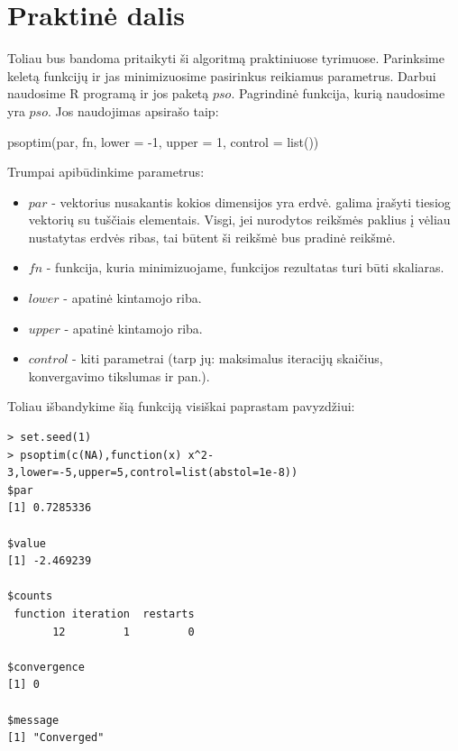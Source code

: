 \documentclass[12pt,a4paper]{article}
\begin{document}
\section{Praktinė dalis}

Toliau bus bandoma pritaikyti ši algoritmą praktiniuose tyrimuose. Parinksime keletą funkcijų ir jas minimizuosime pasirinkus reikiamus parametrus. Darbui naudosime R programą ir jos paketą $pso$. 
Pagrindinė funkcija, kurią naudosime yra $pso$. Jos naudojimas apsirašo taip:


\begin{verbatim*}
psoptim(par, fn, lower = -1, upper = 1, control = list())
\end{verbatim*}

Trumpai apibūdinkime parametrus:

\begin{itemize}
\item $par$ - vektorius nusakantis kokios dimensijos yra erdvė. galima įrašyti tiesiog vektorių su tuščiais elementais. Visgi, jei nurodytos reikšmės paklius į vėliau nustatytas erdvės ribas, tai būtent ši reikšmė bus pradinė reikšmė.
\item $fn$ - funkcija, kuria minimizuojame, funkcijos rezultatas turi būti skaliaras.
\item $lower$  - apatinė kintamojo riba.
\item $upper$  - apatinė kintamojo riba.
\item $control$  - kiti parametrai (tarp jų: maksimalus iteracijų skaičius, konvergavimo tikslumas ir pan.).

\end{itemize}

Toliau išbandykime šią funkciją visiškai paprastam pavyzdžiui:

\begin{spacing}{1}
\begin{verbatim}
> set.seed(1)
> psoptim(c(NA),function(x) x^2-3,lower=-5,upper=5,control=list(abstol=1e-8))
$par
[1] 0.7285336

$value
[1] -2.469239

$counts
 function iteration  restarts 
       12         1         0 

$convergence
[1] 0

$message
[1] "Converged"

\end{verbatim}                                                    
\end{spacing}
\end{document}
